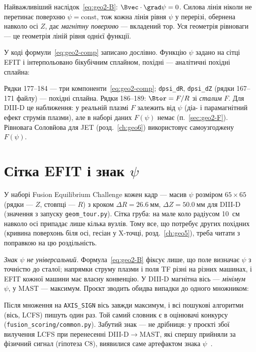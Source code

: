 Найважливіший наслідок~\eqref{eq:geo2-B}: $\Bvec\cdot\grad\psi=0$. Силова лінія ніколи не перетинає поверхню $\psi=\text{const}$, тож кожна лінія рівня $\psi$ у перерізі, обернена навколо осі $Z$, дає \emph{магнітну поверхню} --- вкладений тор. Уся геометрія рівноваги --- це геометрія ліній рівня однієї функції.

У коді формули~\eqref{eq:geo2-comp} записано дослівно. Функцію $\psi$ задано на сітці EFIT і інтерпольовано бікубічним сплайном, похідні --- аналітичні похідні сплайна:


\noindent Рядки 177--184 --- три компоненти~\eqref{eq:geo2-comp}; \texttt{dpsi\_dR}, \texttt{dpsi\_dZ} (рядки 167--171 файлу) --- похідні сплайна. Рядки 186--189: $\Btor=F/R$ зі \emph{сталим} $F$. Для DIII-D це наближення: у реальній плазмі $F$ залежить від $\psi$ (діа- і парамагнітний ефект струмів плазми), але в наборі даних $F(\psi)$ немає (п.~\ref{sec:geo2-F}). Рівновага Соловйова для JET (розд.~\ref{ch:geo6}) використовує самоузгоджену $F(\psi)$.

\section{Сітка EFIT і знак $\psi$}\label{sec:geo2-sign}

У наборі Fusion Equilibrium Challenge кожен кадр --- масив $\psi$ розміром $65\times65$ (рядки --- $Z$, стовпці --- $R$) з кроком $\Delta R=\SI{26,6}{мм}$, $\Delta Z=\SI{50,0}{мм}$ для DIII-D (значення з запуску \texttt{geom\_tour.py}). Сітка груба: на мале коло радіусом \SI{10}{см} навколо осі припадає лише кілька вузлів. Тому все, що потребує других похідних (кривина поверхонь біля осі, гесіан у X-точці, розд.~\ref{ch:geo5}), треба читати з поправкою на цю роздільність.

\emph{Знак $\psi$ не універсальний.} Формула~\eqref{eq:geo2-B} фіксує лише, що поле визначає $\psi$ з точністю до сталої; напрямки струму плазми і поля TF різні на різних машинах, і EFIT кожної машини має власну конвенцію. У DIII-D магнітна вісь --- \emph{мінімум} $\psi$, у MAST --- максимум. Проєкт зводить обидва випадки до одного множником:


\noindent Після множення на \texttt{AXIS\_SIGN} вісь завжди максимум, і всі пошукові алгоритми (вісь, LCFS) пишуть один раз. Той самий словник є в оцінювачі конкурсу (\texttt{fusion\_scoring/common.py}). Забутий знак --- не дрібниця: у проєкті збої вилучення LCFS при перенесенні DIII-D$\to$MAST, які спершу прийняли за фізичний сигнал (гіпотеза C8), виявилися саме артефактом знака $\psi$~\cite[розд.~4, R9]{Manual}.

